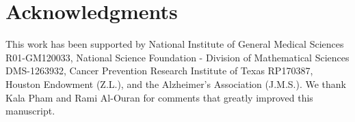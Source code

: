 \documentclass[wsdraft]{ws-procs11x85}
\begin{document}
\section*{Acknowledgments}
This work has been supported by National Institute of General Medical Sciences R01-GM120033, National Science Foundation - Division of Mathematical Sciences DMS-1263932, Cancer Prevention Research Institute of Texas RP170387, Houston Endowment (Z.L.), and the Alzheimer's Association (J.M.S.). 
We thank Kala Pham and Rami Al-Ouran for comments that greatly improved this manuscript.




\end{document}

